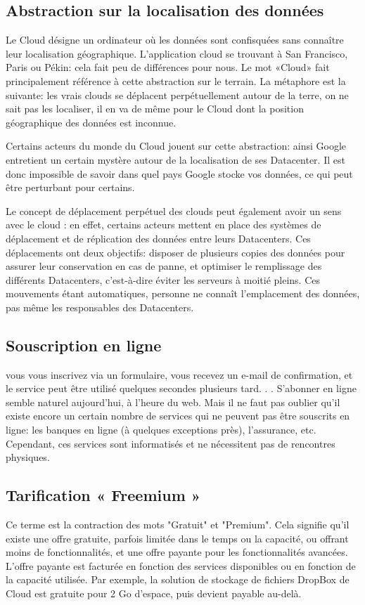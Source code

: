 \subsection{Abstraction sur la localisation des données}
Le Cloud désigne un ordinateur où les données sont confisquées sans connaître leur localisation  géographique. L'application cloud se trouvant à San Francisco, Paris ou Pékin: cela fait peu de différences pour nous. Le mot «Cloud» fait principalement référence à cette abstraction sur le terrain. La métaphore est la suivante: les vrais clouds se déplacent perpétuellement autour de la terre, on ne sait pas les localiser, il en va de même pour le Cloud dont la position géographique des données est inconnue.


Certains acteurs du monde du Cloud jouent sur cette abstraction: ainsi Google entretient un certain mystère autour de la localisation de ses Datacenter. Il est donc impossible de savoir dans quel pays Google stocke vos données, ce qui peut être perturbant pour certains.


Le concept de déplacement perpétuel des clouds peut également avoir un sens avec le cloud : en effet, certains acteurs mettent en place des systèmes de déplacement et de réplication des données entre leurs Datacenters. Ces déplacements ont deux objectifs: disposer de plusieurs copies des données pour assurer leur conservation en cas de panne, et optimiser le remplissage des différents Datacenters, c'est-à-dire éviter les serveurs à moitié pleins. Ces mouvements étant automatiques, personne ne connaît l'emplacement des données, pas même les responsables des Datacenters.
\subsection{Souscription en ligne}
vous vous inscrivez via un formulaire, vous recevez un e-mail de confirmation, et le service peut être utilisé quelques secondes plusieurs tard. . . S'abonner en ligne semble naturel aujourd'hui, à l'heure du web. Mais il ne faut pas oublier qu'il existe encore un certain nombre de services qui ne peuvent pas être souscrits en ligne: les banques en ligne (à quelques exceptions près), l'assurance, etc. Cependant, ces services sont informatisés et ne nécessitent pas de rencontres physiques.
\subsection{Tarification « Freemium »}
Ce terme est la contraction des mots "Gratuit" et "Premium". Cela signifie qu'il existe une offre gratuite, parfois limitée dans le temps ou la capacité, ou offrant moins de fonctionnalités, et une offre payante pour les fonctionnalités avancées. L'offre payante est facturée en fonction des services disponibles ou en fonction de la capacité utilisée. Par exemple, la solution de stockage de fichiers DropBox de Cloud est gratuite pour 2 Go d'espace, puis devient payable au-delà.
